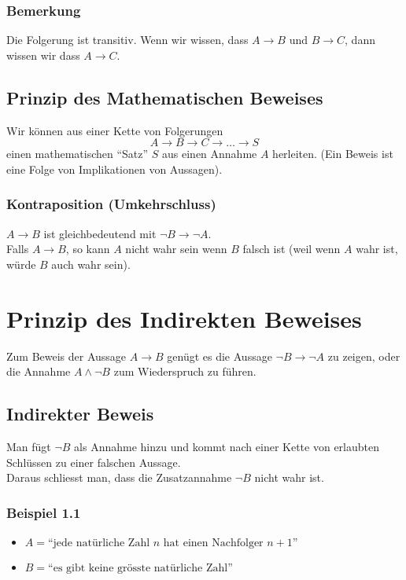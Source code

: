\subsubsection*{Bemerkung}
Die Folgerung ist transitiv. Wenn wir wissen, dass $A\to B$ und $B\to C$, dann wissen wir dass $A\to C$.


\subsection*{Prinzip des Mathematischen Beweises}
Wir können aus einer Kette von Folgerungen \[A\to B \to C \to\dots \to S\]
einen mathematischen ``Satz'' $S$ aus einen Annahme $A$ herleiten. (Ein Beweis ist eine Folge von Implikationen von Aussagen). 
\subsubsection*{Kontraposition (Umkehrschluss)}

$A\to B$ ist gleichbedeutend mit $\lnot B\to\lnot A$.\\
Falls $A\to B$, so kann $A$ nicht wahr sein wenn $B$ falsch ist (weil wenn $A$ wahr ist, würde $B$ auch wahr sein).

\section{Prinzip des Indirekten Beweises}
Zum Beweis der Aussage $A\to B$ genügt es die Aussage $\lnot B\to\lnot A$ zu zeigen, oder die Annahme $A\land\lnot B$ zum Wiederspruch zu führen.

\subsection*{Indirekter Beweis}
Man fügt $\lnot B$ als Annahme hinzu und kommt nach einer Kette von erlaubten Schlüssen zu einer falschen Aussage.\\

\noindent Daraus schliesst man, dass die Zusatzannahme $\lnot B$ nicht wahr ist. 

\subsubsection*{Beispiel 1.1}
\begin{itemize}
\item $A=\text{``jede natürliche Zahl } n \text{ hat einen Nachfolger } n+1\text{''}$
\item $B=\text{``es gibt keine grösste natürliche Zahl''}$
\end{itemize}

